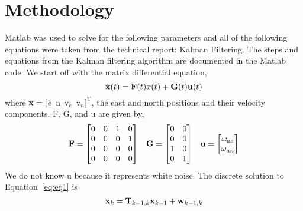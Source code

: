 
\section{Methodology} 

\label{sec:methodology}

Matlab was used to solve for the following parameters and all of the following equations were taken from the technical report: Kalman Filtering.\cite{milanGPS} 
The steps and equations from the Kalman filtering algorithm are documented in the Matlab code. 
We start off with the matrix differential equation,
\begin{equation}
	\dot{\mathbf{x}} (t) = \mathbf{F} (t) x (t) + \mathbf{G} (t) \mathbf{u} (t) 
	\label{eq:eq1}
\end{equation} %
where $\mathbf{x} = [${\rmfamily e~n~v$_e$~v$_n$}$]^{\mathrm{T}}$, the east and north positions and their velocity components. \+F, \+G, and \+u are given by,
\begin{equation}
	\begin{array}{ccc}
		\mathbf{F}= \left[
		\begin{matrix}
			0 & 0 & 1 & 0 \\
			0 & 0 & 0 & 1 \\
			0 & 0 & 0 & 0 \\
			0 & 0 & 0 & 0 \\
		\end{matrix}
		\right] & 
		\mathbf{G} = \left[
		\begin{matrix}
			0 & 0 \\
			0 & 0 \\
			1 & 0 \\
			0 & 1 \\
		\end{matrix}
		\right] & 
		\mathbf{u} = \left[
		\begin{matrix}
			\omega_{ae} \\
			\omega_{an} \\
		\end{matrix}
		\right] 
	\end{array}
\end{equation}
We do not know \+u because it represents white noise.  The discrete solution to Equation~\eqref{eq:eq1} is
\begin{equation}
	\mathbf{x}_k = \mathbf{T}_{k-1,k}\mathbf{x}_{k-1} + \mathbf{w}_{k-1,k}
	\label{eq:discreteSolutionToeq1}
\end{equation} %
